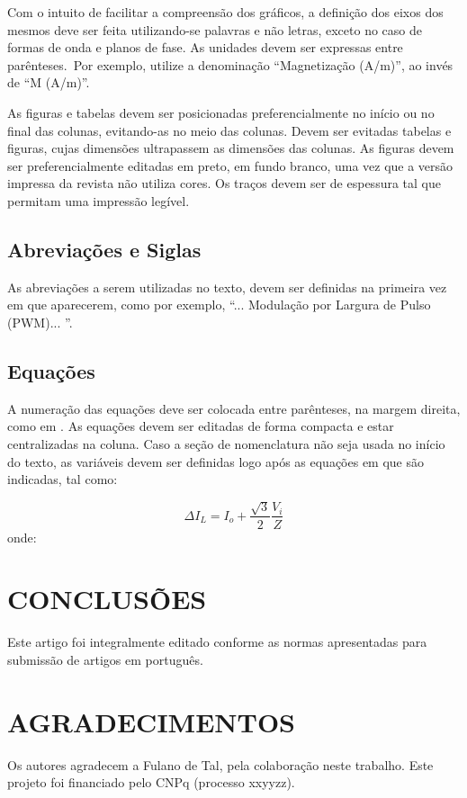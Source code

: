 Com o intuito de facilitar a compreensão dos gráficos, a definição dos eixos dos mesmos deve ser feita utilizando-se palavras e não letras, exceto no caso de formas de onda e planos de fase. As unidades devem ser expressas entre parênteses.~Por exemplo, utilize a denominação ``Magnetização (A/m)'', ao invés de ``M (A/m)''.

As figuras e tabelas devem ser posicionadas preferencialmente no início ou no final das colunas, evitando-as no meio das colunas. Devem ser evitadas tabelas e figuras, cujas dimensões ultrapassem as dimensões das colunas. As figuras devem ser preferencialmente editadas em preto, em fundo branco, uma vez que a versão impressa da revista não utiliza cores. Os traços devem ser de espessura tal que permitam uma impressão legível.

\subsection{Abreviações e Siglas}

As abreviações a serem utilizadas no texto, devem ser definidas na primeira vez em que aparecerem, como por exemplo, ``... Modulação por Largura de Pulso  (PWM)... ''.

\subsection{Equações}

A numeração das equações deve ser colocada entre parênteses, na margem direita, como em . As equações devem ser editadas de forma compacta e estar centralizadas na coluna. Caso a seção de nomenclatura não seja usada no início do texto, as variáveis devem ser definidas logo após as equações em que são indicadas, tal como:

\begin{equation}\label{eq:eq01}
\Delta I_{L}=I_{o}+\frac{\sqrt{3}}{2}\frac{V_{i}}{Z}
\end{equation} 
onde: 

\balance



\section{CONCLUSÕES}
Este artigo foi integralmente editado conforme as normas apresentadas para submissão de artigos em português.


\section*{AGRADECIMENTOS}
Os autores agradecem a Fulano de Tal, pela colaboração neste trabalho. Este projeto foi financiado pelo CNPq (processo xxyyzz).






\balance


